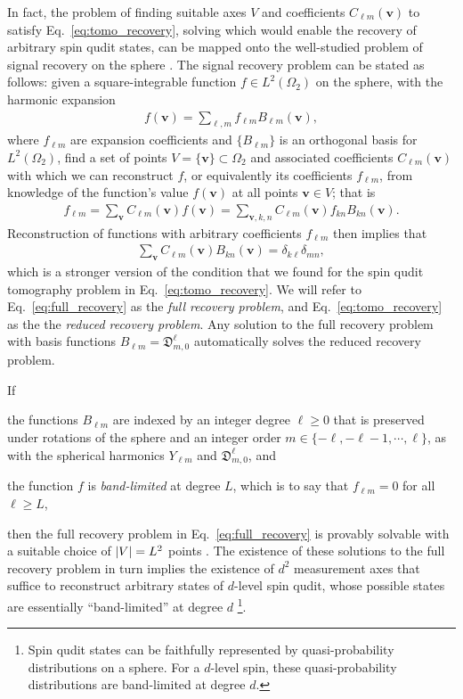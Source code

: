\documentclass[notitlepage,twocolumn]{revtex4-2}
\newcommand{\p}[1]{\left(#1\right)} %
\renewcommand{\set}[1]{\{#1\}} %
\renewcommand{\v}{\bm} %
\newcommand{\1}{\mathds{1}}
\newcommand{\D}{\mathfrak{D}}
\begin{document}
In fact, the problem of finding suitable axes $V$ and coefficients $C_{\ell m}\p{\v v}$ to satisfy Eq.~\eqref{eq:tomo_recovery}, solving which would enable the recovery of arbitrary spin qudit states, can be mapped onto the well-studied problem of signal recovery on the sphere \cite{mcewen2011novel, mcewen2011sampling, rauhut2011sparse, alem2012sparse, khalid2014optimaldimensionality}.
The signal recovery problem can be stated as follows: given a square-integrable function $f\in L^2\p{\Omega_2}$ on the sphere, with the harmonic expansion
\begin{align}
  f\p{\v v} = \sum_{\ell,m} f_{\ell m} B_{\ell m}\p{\v v},
\end{align}
where $f_{\ell m}$ are expansion coefficients and $\set{B_{\ell m}}$ is an orthogonal basis for $L^2\p{\Omega_2}$, find a set of points $V=\set{\v v}\subset\Omega_2$ and associated coefficients $C_{\ell m}\p{\v v}$ with which we can reconstruct $f$, or equivalently its coefficients $f_{\ell m}$, from knowledge of the function's value $f\p{\v v}$ at all points $\v v\in V$; that is
\begin{align}
  f_{\ell m} = \sum_{\v v} C_{\ell m}\p{\v v} f\p{\v v}
  = \sum_{\v v,k,n} C_{\ell m}\p{\v v} f_{kn} B_{kn}\p{\v v}.
\end{align}
Reconstruction of functions with arbitrary coefficients $f_{\ell m}$ then implies that
\begin{align}
  \sum_{\v v} C_{\ell m}\p{\v v} B_{kn}\p{\v v}
  = \delta_{k\ell} \delta_{mn},
  \label{eq:full_recovery}
\end{align}
which is a stronger version of the condition that we found for the spin qudit tomography problem in Eq.~\eqref{eq:tomo_recovery}.
We will refer to Eq.~\eqref{eq:full_recovery} as the {\it full recovery problem}, and Eq.~\eqref{eq:tomo_recovery} as the the {\it reduced recovery problem}.
Any solution to the full recovery problem with basis functions $B_{\ell m}=\D^\ell_{m,0}$ automatically solves the reduced recovery problem.

If
\begin{enumerate*}
\item the functions $B_{\ell m}$ are indexed by an integer degree $\ell\ge0$ that is preserved under rotations of the sphere and an integer order $m\in\set{-\ell,-\ell-1,\cdots,\ell}$, as with the spherical harmonics $Y_{\ell m}$ and $\D^\ell_{m,0}$, and
\item the function $f$ is {\it band-limited} at degree $L$, which is to say that $f_{\ell m}=0$ for all $\ell\ge L$,
\end{enumerate*}
then the full recovery problem in Eq.~\eqref{eq:full_recovery} is provably solvable with a suitable choice of $\abs{V}=L^2$ points \cite{freeden2008spherical, freeden2018spherical}.
The existence of these solutions to the full recovery problem in turn implies the existence of $d^2$ measurement axes that suffice to reconstruct arbitrary states of $d$-level spin qudit, whose possible states are essentially ``band-limited'' at degree $d$ \footnote{Spin qudit states can be faithfully represented by quasi-probability distributions on a sphere.  For a $d$-level spin, these quasi-probability distributions are band-limited at degree $d$.}.
\end{document}
